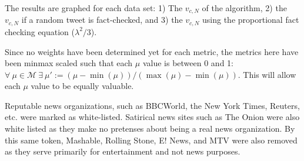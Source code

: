 \documentclass[preprint,12pt]{elsarticle}
\begin{document}
The results are graphed for each data set: 1) The $v_{c,N}$ of the algorithm, 2) the $v_{c,N}$ if a random tweet is fact-checked, and 3) the $v_{c,N}$ using the proportional fact checking equation ($\lambda^2/3$).

Since no weights have been determined yet for each metric, the metrics here have been minmax scaled such that each $\mu$ value is between 0 and 1: $\forall \ \mu \in \mathcal{M} \  \exists \ \mu' := (\mu - \min(\mu))/(\max(\mu) - \min(\mu))$.
This will allow each $\mu$ value to be equally valuable.

Reputable news organizations, such as BBCWorld, the New York Times, Reuters, etc.  were marked as white-listed. Satirical news sites such as The Onion were also white listed as they make no pretenses about being a real news organization. By this same token, Mashable, Rolling Stone, E! News, and MTV were also removed as they serve primarily for entertainment and not news purposes.
\end{document}
